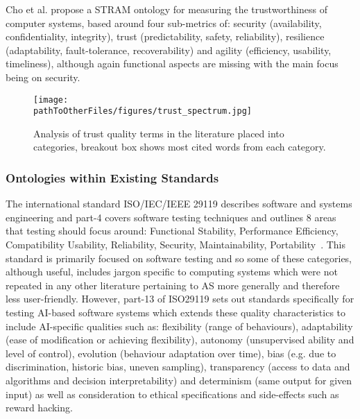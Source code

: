 Cho et al. propose a STRAM ontology for measuring the trustworthiness of computer systems, based around four sub-metrics of: security (availability, confidentiality, integrity), trust (predictability, safety, reliability), resilience (adaptability, fault-tolerance, recoverability) and agility (efficiency, usability, timeliness), although again functional aspects are missing with the main focus being on security.

\begin{figure*}[]
    \centering
    \texttt{[image: \\pathToOtherFiles/figures/trust\_spectrum.jpg]}
    \caption{Analysis of trust quality terms in the literature placed into categories, breakout box shows most cited words from each category.}
    \label{fig:trust_spectrum}
\end{figure*}


\subsubsection{Ontologies within Existing Standards}

The international standard ISO/IEC/IEEE 29119 describes software and systems engineering and part-4 covers software testing techniques and outlines 8 areas that testing should focus around: Functional Stability, Performance Efficiency, Compatibility
Usability, Reliability, Security, Maintainability, Portability~\cite{ISO29119}. 
%
This standard is primarily focused on software testing and so some of these categories, although useful, includes jargon specific to computing systems which were not repeated in any other literature pertaining to AS more generally and therefore less user-friendly. However, part-13 of ISO29119 sets out standards specifically for testing AI-based software systems which extends these quality characteristics to include AI-specific qualities such as: flexibility (range of behaviours), adaptability (ease of modification or achieving flexibility), autonomy (unsupervised ability and level of control), evolution (behaviour adaptation over time), bias (e.g. due to discrimination, historic bias, uneven sampling), transparency (access to data and algorithms and decision interpretability) and determinism (same output for given input) as well as consideration to ethical specifications and side-effects such as reward hacking. 

